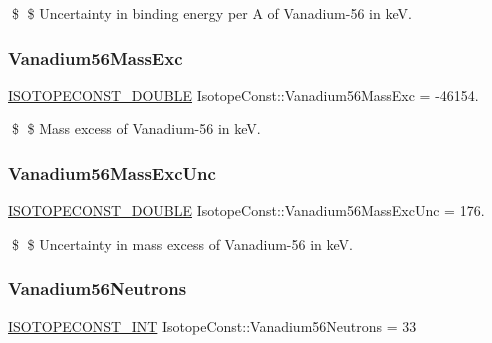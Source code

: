 \$ \$ Uncertainty in binding energy per A of Vanadium-\/56 in keV. \mbox{\label{group___isotope_const-_vanadium-_v56_ga58405f0a8866e5fd7df261b26d9b47e0}} 
\subsubsection{\texorpdfstring{Vanadium56\+Mass\+Exc}{Vanadium56MassExc}}
{\footnotesize\ttfamily \mbox{\hyperlink{group___isotope_const-_macros_ga8f45a7272ce02c0b4c65c44636ed719a}{I\+S\+O\+T\+O\+P\+E\+C\+O\+N\+S\+T\+\_\+\+D\+O\+U\+B\+LE}} Isotope\+Const\+::\+Vanadium56\+Mass\+Exc = -\/46154.}

\$ \$ Mass excess of Vanadium-\/56 in keV. \mbox{\label{group___isotope_const-_vanadium-_v56_ga6eb112b93662b2088e09fabdb2475e44}} 
\subsubsection{\texorpdfstring{Vanadium56\+Mass\+Exc\+Unc}{Vanadium56MassExcUnc}}
{\footnotesize\ttfamily \mbox{\hyperlink{group___isotope_const-_macros_ga8f45a7272ce02c0b4c65c44636ed719a}{I\+S\+O\+T\+O\+P\+E\+C\+O\+N\+S\+T\+\_\+\+D\+O\+U\+B\+LE}} Isotope\+Const\+::\+Vanadium56\+Mass\+Exc\+Unc = 176.}

\$ \$ Uncertainty in mass excess of Vanadium-\/56 in keV. \mbox{\label{group___isotope_const-_vanadium-_v56_gac1e7255ab501c792c7fad71a4effc423}} 
\subsubsection{\texorpdfstring{Vanadium56\+Neutrons}{Vanadium56Neutrons}}
{\footnotesize\ttfamily \mbox{\hyperlink{group___isotope_const-_macros_ga5f18360b3e99483a35c32d789e62621c}{I\+S\+O\+T\+O\+P\+E\+C\+O\+N\+S\+T\+\_\+\+I\+NT}} Isotope\+Const\+::\+Vanadium56\+Neutrons = 33}

